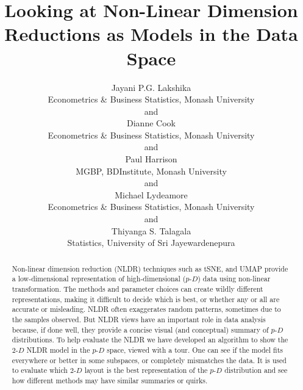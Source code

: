 \documentclass[
  12pt]{article}
\begin{document}
\def\spacingset#1{\renewcommand{\baselinestretch}%
{#1}\small\normalsize} \spacingset{1}



\title{\bf Looking at Non-Linear Dimension Reductions as Models in the
Data Space}
\author{
Jayani P.G. Lakshika\\
Econometrics \& Business Statistics, Monash University\\
and\\Dianne Cook\\
Econometrics \& Business Statistics, Monash University\\
and\\Paul Harrison\\
MGBP, BDInstitute, Monash University\\
and\\Michael Lydeamore\\
Econometrics \& Business Statistics, Monash University\\
and\\Thiyanga S. Talagala\\
Statistics, University of Sri Jayewardenepura\\
}
\maketitle

\bigskip
\bigskip
\begin{abstract}
Non-linear dimension reduction (NLDR) techniques such as tSNE, and UMAP
provide a low-dimensional representation of high-dimensional
(\(p\text{-}D\)) data using non-linear transformation. The methods and
parameter choices can create wildly different representations, making it
difficult to decide which is best, or whether any or all are accurate or
misleading. NLDR often exaggerates random patterns, sometimes due to the
samples observed. But NLDR views have an important role in data analysis
because, if done well, they provide a concise visual (and conceptual)
summary of \(p\text{-}D\) distributions. To help evaluate the NLDR we
have developed an algorithm to show the \(2\text{-}D\) NLDR model in the
\(p\text{-}D\) space, viewed with a tour. One can see if the model fits
everywhere or better in some subspaces, or completely mismatches the
data. It is used to evaluate which \(2\text{-}D\) layout is the best
representation of the \(p\text{-}D\) distribution and see how different
methods may have similar summaries or quirks.
\end{abstract}
\end{document}
